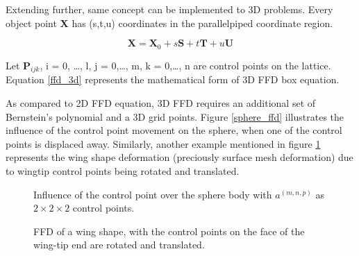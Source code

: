Extending further, same concept can be implemented to 3D problems. Every object point \textbf{X} has (s,t,u) coordinates in the parallelpiped coordinate region\cite{soderberg}.

\begin{equation}
\mathbf{X}=\mathbf{X}_{0}+s \mathbf{S}+t \mathbf{T}+u \mathbf{U}
\label{ffd initial equation}
\end{equation}

Let $\textbf{P}_{ijk}$, i = 0, \dots, l, j = 0,\dots, m, k = 0,\dots, n are control points on the lattice. Equation \ref{ffd_3d} represents the mathematical form of 3D FFD box equation.


As compared to 2D FFD equation, 3D FFD requires an additional set of Bernstein's polynomial and a 3D grid points. Figure \ref{sphere_ffd} illustrates the influence of the control point movement on the sphere, when one of the control points is displaced away. Similarly, another example mentioned in figure \ref{wing_ffd} represents the wing shape deformation (preciously surface mesh deformation) due to wingtip control points being rotated and translated.

\begin{figure}
\parbox{0.49\linewidth}
{
\centering
 \caption{Influence of the control point over the sphere body with $a^{(m,n,p)}$ as $2 \times 2 \times 2$ control points.}
 \label{sphere_ffd}
}
\parbox{0.47\linewidth}
{
\centering
  \caption{FFD of a wing shape, with the control points on the face of the wing-tip end are rotated and translated.}
  \label{wing_ffd}
}
\end{figure}

